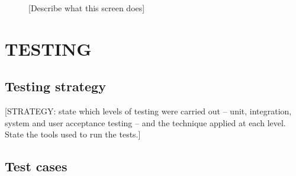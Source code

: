 \begin{figure}[H]
  \centering
  \caption{[Describe what this screen does]}
  \label{fig:screenshot-2}
\end{figure}

\section{TESTING}
\label{sec:testing}

\subsection{Testing strategy}
\label{subsec:testing-strategy}

[STRATEGY: state which levels of testing were carried out -- unit,
integration, system and user acceptance testing -- and the technique
applied at each level. State the tools used to run the tests.]

\subsection{Test cases}
\label{subsec:test-cases}

